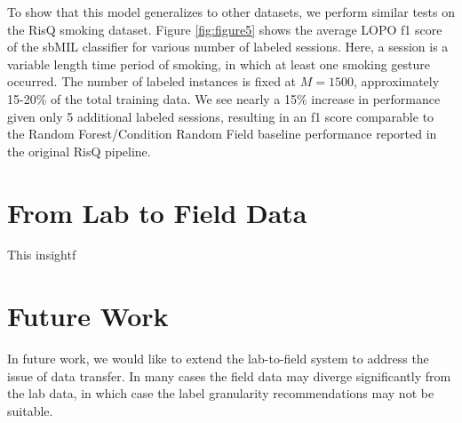 \documentclass{sigchi}
\begin{document}
To show that this model generalizes to other datasets, we perform similar tests on the RisQ smoking dataset. Figure \ref{fig:figure5} shows the average LOPO f1 score of the sbMIL classifier for various number of labeled sessions. Here, a session is a variable length time period of smoking, in which at least one smoking gesture occurred. The number of labeled instances is fixed at $M = 1500$, approximately 15-20\% of the total training data. We see nearly a 15\% increase in performance given only 5 additional labeled sessions, resulting in an f1 score comparable to the Random Forest/Condition Random Field baseline performance reported in the original RisQ pipeline.

\section{From Lab to Field Data}

This insightf




\section{Future Work}

In future work, we would like to extend the lab-to-field system to address the issue of data transfer. In many cases the field data may diverge significantly from the lab data, in which case the label granularity recommendations may not be suitable.
\end{document}
